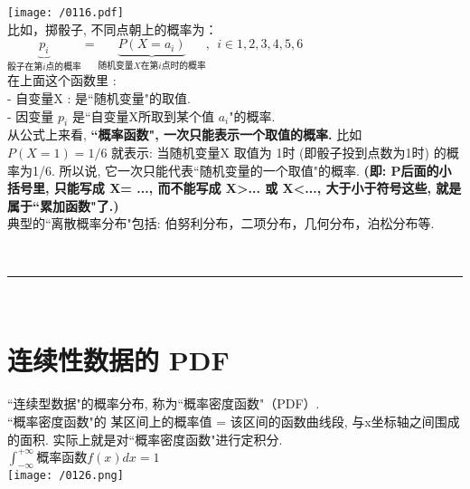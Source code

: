 \documentclass[UTF8]{ctexart}
\begin{document}
\texttt{[image: /0116.pdf]} \\

比如，掷骰子, 不同点朝上的概率为：$
\underset{\text{骰子在第}i\text{点的概率}}{\underbrace{p_i}}=\underset{\text{随机变量}X\text{在第}i\text{点时的概率}}{\underbrace{P(X=a_i)}},\ \ i\in 1,2,3,4,5,6
$ \\

在上面这个函数里 : \\
- 自变量X : 是``随机变量"的取值. \\
- 因变量  $ p_i$ 是``自变量X所取到某个值 $a_i$"的概率. \\

从公式上来看, \textbf{``概率函数", 一次只能表示一个取值的概率.} 比如 $ P(X=1)= 1/6$ 就表示: 当随机变量X 取值为 1时 (即骰子投到点数为1时) 的概率为1/6. 所以说, 它一次只能代表``随机变量的一个取值"的概率. \textbf{(即: P后面的小括号里, 只能写成 X= ..., 而不能写成 X>... 或 X<..., 大于小于符号这些, 就是属于``累加函数"了.)}\\



典型的``离散概率分布"包括: 伯努利分布，二项分布，几何分布，泊松分布等. 


~\\
\hrule
~\\


\section{连续性数据的 PDF}

``连续型数据"的概率分布, 称为``概率密度函数"（PDF）.  \\


``概率密度函数"的 某区间上的概率值 = 该区间的函数曲线段, 与x坐标轴之间围成的面积. 实际上就是对``概率密度函数"进行定积分. \\


$\int_{ - \infty }^{ + \infty } \text{概率函数}f(x)dx = 1$ \\
\texttt{[image: /0126.png]} \\
\end{document}
